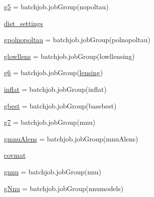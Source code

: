 \begin{DoxyCompactItemize}
\item 
\mbox{\hyperlink{namespaceplanck_1_1settings__planck__2015_a6311adc7888965d1dc6e52506cddebd3}{g5}} = batchjob.\+job\+Group(\textquotesingle{}nopoltau\textquotesingle{})
\item 
\mbox{\hyperlink{namespaceplanck_1_1settings__planck__2015_a168acdeb73e627d1f1dcf9e11ba082b1}{dist\+\_\+settings}}
\item 
\mbox{\hyperlink{namespaceplanck_1_1settings__planck__2015_ad129cbeca7a3d983f53f3c9fcb71dc18}{gpolnopoltau}} = batchjob.\+job\+Group(\textquotesingle{}polnopoltau\textquotesingle{})
\item 
\mbox{\hyperlink{namespaceplanck_1_1settings__planck__2015_a8ec245afcbc34c3f4ffc98524de40343}{glowllens}} = batchjob.\+job\+Group(\textquotesingle{}lowllensing\textquotesingle{})
\item 
\mbox{\hyperlink{namespaceplanck_1_1settings__planck__2015_abb123674ae6bac8c7022ef35a40d60f8}{g6}} = batchjob.\+job\+Group(\textquotesingle{}\mbox{\hyperlink{namespaceplanck_1_1settings__planck__2015_ad92b077f23ecca52bf992daa771c2686}{lensing}}\textquotesingle{})
\item 
\mbox{\hyperlink{namespaceplanck_1_1settings__planck__2015_a6bc851773e5ea1fb57616d0dbea1335c}{inflat}} = batchjob.\+job\+Group(\textquotesingle{}inflat\textquotesingle{})
\item 
\mbox{\hyperlink{namespaceplanck_1_1settings__planck__2015_a0ff3bbbcb0e3f64b761f7658e46b2570}{gbest}} = batchjob.\+job\+Group(\textquotesingle{}basebest\textquotesingle{})
\item 
\mbox{\hyperlink{namespaceplanck_1_1settings__planck__2015_a4cd7ec801cb7fb1e848d776141ec5dd9}{g7}} = batchjob.\+job\+Group(\textquotesingle{}mnu\textquotesingle{})
\item 
\mbox{\hyperlink{namespaceplanck_1_1settings__planck__2015_a18cd3d2d53c0c2eab3b74bfcea3d0270}{gmnu\+Alens}} = batchjob.\+job\+Group(\textquotesingle{}mnu\+Alens\textquotesingle{})
\item 
\mbox{\hyperlink{namespaceplanck_1_1settings__planck__2015_a12af416d95bcf3711148f61692a152a3}{covmat}}
\item 
\mbox{\hyperlink{namespaceplanck_1_1settings__planck__2015_a7031a22615cf42a266d5a9b724623763}{gnnu}} = batchjob.\+job\+Group(\textquotesingle{}nnu\textquotesingle{})
\item 
\mbox{\hyperlink{namespaceplanck_1_1settings__planck__2015_ae72cab89e5c60cb09b1d455077ea9d86}{g\+Nnu}} = batchjob.\+job\+Group(\textquotesingle{}nnumodels\textquotesingle{})

\end{DoxyCompactItemize}
